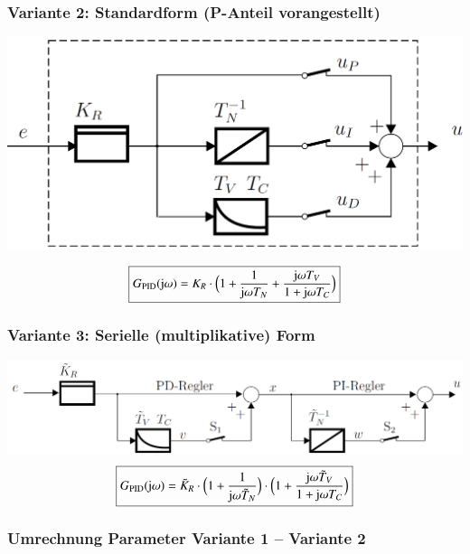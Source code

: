 \subsubsection{Variante 2: Standardform (P-Anteil vorangestellt)}
\label{PID-Regler Standardform}

\begin{minipage}[c]{0.47\columnwidth}
    \includegraphics[width=\columnwidth]{images/pid_regler_aufbau_standardform.png}
\end{minipage}
\hfill
\begin{minipage}[c]{0.52\columnwidth}
    $$ \boxed{ G_{\rm PID}(\mathrm{j} \omega) = K_R \cdot \Big( 1 + \frac{1}{\mathrm{j} \omega T_N} +\frac{\mathrm{j} \omega T_V}{1 + \mathrm{j} \omega T_C} \Big) } $$
\end{minipage}


\subsubsection{Variante 3: Serielle (multiplikative) Form}
\label{PID-Regler multiplikative Form}

    \includegraphics[width=0.8\columnwidth]{images/pid_regler_aufbau_serielle_form.png}
    $$ \boxed{ G_{\rm PID}(\mathrm{j} \omega) = \tilde{K}_R \cdot \Big( 1 + \frac{1}{\mathrm{j} \omega \tilde{T}_N} \Big) \cdot \Big(1 + \frac{\mathrm{j} \omega \tilde{T}_V}{1 + \mathrm{j} \omega T_C} \Big) } $$

\subsubsection{Umrechnung Parameter Variante 1 -- Variante 2}

